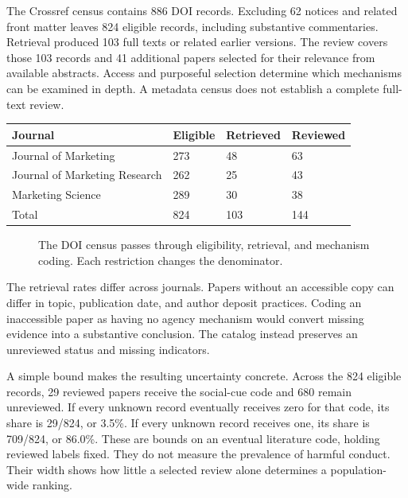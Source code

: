 The Crossref census contains 886 DOI records. Excluding 62 notices and
related front matter leaves 824 eligible records, including substantive
commentaries. Retrieval produced 103 full texts or related earlier
versions. The review covers those 103 records and 41 additional papers
selected for their relevance from available abstracts. Access and
purposeful selection determine which mechanisms can be examined in
depth. A metadata census does not establish a complete full-text review.

\begin{table}[H]
\centering\small
\begin{tabular}{@{}llll@{}}
\toprule
Journal & Eligible & Retrieved & Reviewed \\
\midrule

Journal of Marketing & 273 & 48 & 63 \\
Journal of Marketing Research & 262 & 25 & 43 \\
Marketing Science & 289 & 30 & 38 \\
Total & 824 & 103 & 144 \\
\bottomrule
\end{tabular}
\end{table}

\begin{figure}[htbp]
\centering

\caption{The DOI census passes through eligibility, retrieval, and mechanism coding. Each restriction changes the denominator.}\label{fig:M02_literature_selection}
\end{figure}

The retrieval rates differ across journals. Papers without an accessible
copy can differ in topic, publication date, and author deposit
practices. Coding an inaccessible paper as having no agency mechanism
would convert missing evidence into a substantive conclusion. The
catalog instead preserves an unreviewed status and missing indicators.

A simple bound makes the resulting uncertainty concrete. Across the 824
eligible records, 29 reviewed papers receive the social-cue code and 680
remain unreviewed. If every unknown record eventually receives zero for
that code, its share is 29/824, or 3.5\%. If every unknown record
receives one, its share is 709/824, or 86.0\%. These are bounds on an
eventual literature code, holding reviewed labels fixed. They do not
measure the prevalence of harmful conduct. Their width shows how little
a selected review alone determines a population-wide ranking.

